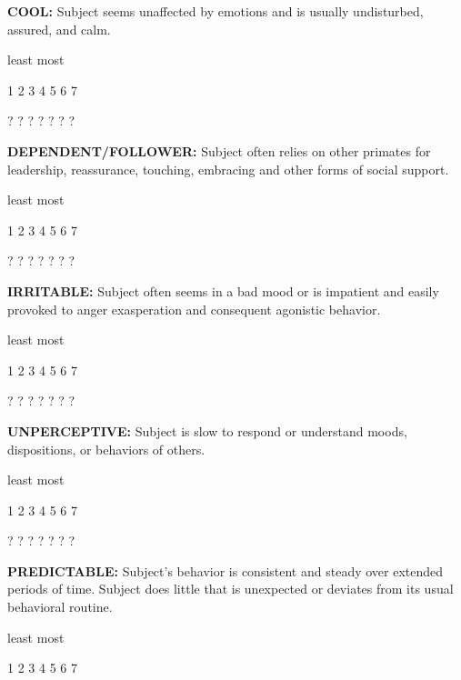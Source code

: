 \documentclass{article} %
\begin{document}
\noindent  

\noindent \textbf{COOL:} Subject seems unaffected by emotions and is usually undisturbed, assured, and calm. 

\noindent  

\noindent least                            most

  1    2    3    4    5    6    7   

  ?    ?    ?    ?    ?    ?    ?   

\noindent \textbf{ }

\noindent \textbf{DEPENDENT/FOLLOWER:} Subject often relies on other primates for leadership, reassurance, touching, embracing and other forms of social support. 

\noindent  

\noindent least                            most

  1    2    3    4    5    6    7   

  ?    ?    ?    ?    ?    ?    ?   

\noindent  

\noindent \textbf{IRRITABLE:} Subject often seems in a bad mood or is impatient and easily provoked to anger exasperation and consequent agonistic behavior. 

\noindent  

\noindent least                            most

  1    2    3    4    5    6    7   

  ?    ?    ?    ?    ?    ?    ?   

\noindent \textbf{ }

\noindent \textbf{UNPERCEPTIVE:} Subject is slow to respond or understand moods, dispositions, or behaviors of others. 

\noindent  

\noindent least                            most

  1    2    3    4    5    6    7   

  ?    ?    ?    ?    ?    ?    ?   

\noindent  

\noindent \textbf{PREDICTABLE:} Subject's behavior is consistent and steady over extended periods of time. Subject does little that is unexpected or deviates from its usual behavioral routine. 

\noindent  

\noindent least                            most

  1    2    3    4    5    6    7   
\end{document}
